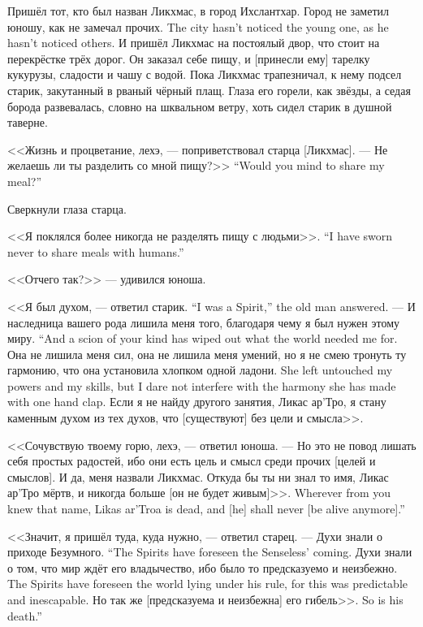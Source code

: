Пришёл тот, кто был назван Ликхмас, в город Ихслантхар.
{Город не заметил юношу, как не замечал прочих.}
{The city hasn't noticed the young one, as he hasn't noticed others.}
И пришёл Ликхмас на постоялый двор, что стоит на перекрёстке трёх дорог\FM.
Он заказал себе пищу, и [принесли ему] тарелку кукурузы, сладости и чашу с водой\FM.
Пока Ликхмас трапезничал, к нему подсел старик, закутанный в рваный чёрный плащ.
Глаза его горели, как звёзды, а седая борода развевалась, словно на шквальном ветру, хоть сидел старик в душной таверне.

<<Жизнь и процветание, лехэ, --- поприветствовал старца [Ликхмас].
{--- Не желаешь ли ты разделить со мной пищу?>>}
{``Would you mind to share my meal?''}

Сверкнули глаза старца.

{<<Я поклялся более никогда не разделять пищу с людьми>>.}
{``I have sworn never to share meals with humans.''}

<<Отчего так?>> --- удивился юноша.

{<<Я был духом, --- ответил старик.}
{``I was a Spirit,'' the old man answered.}
{--- И наследница вашего рода лишила меня того, благодаря чему я был нужен этому миру.}
{``And a scion of your kind has wiped out what the world needed me for.}
{Она не лишила меня сил, она не лишила меня умений, но я не смею тронуть ту гармонию, что она установила хлопком одной ладони.}
{She left untouched my powers and my skills, but I dare not interfere with the harmony she has made with one hand clap.}
Если я не найду другого занятия, Ликас ар'Тро, я стану каменным духом из тех духов, что [существуют] без цели и смысла>>.

<<Сочувствую твоему горю, лехэ, --- ответил юноша.
--- Но это не повод лишать себя простых радостей, ибо они есть цель и смысл среди прочих [целей и смыслов].
И да, меня назвали Ликхмас.
{Откуда бы ты ни знал то имя, Ликас ар'Тро мёртв, и никогда больше [он не будет живым]>>.}
{Wherever from you knew that name, Likas ar'Troa is dead, and [he] shall never [be alive anymore].''}

<<Значит, я пришёл туда, куда нужно, --- ответил старец.
{--- Духи знали о приходе Безумного.}
{``The Spirits have foreseen the Senseless' coming.}
{Духи знали о том, что мир ждёт его владычество, ибо было то предсказуемо и неизбежно.}
{The Spirits have foreseen the world lying under his rule, for this was predictable and inescapable.}
{Но так же [предсказуема и неизбежна] его гибель>>.}
{So is his death.''}

